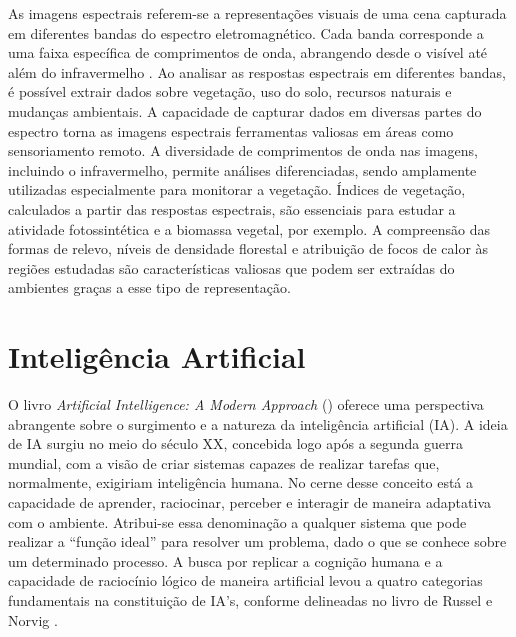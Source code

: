 As imagens espectrais referem-se a representações visuais de uma cena capturada em diferentes bandas do espectro eletromagnético. Cada banda corresponde a uma faixa específica de comprimentos de onda, abrangendo desde o visível até além do infravermelho \cite{novo01:ponzoni}. Ao analisar as respostas espectrais em diferentes bandas, é possível extrair dados sobre vegetação, uso do solo, recursos naturais e mudanças ambientais. A capacidade de capturar dados em diversas partes do espectro torna as imagens espectrais ferramentas valiosas em áreas como sensoriamento remoto. A diversidade de comprimentos de onda nas imagens, incluindo o infravermelho, permite análises diferenciadas, sendo amplamente utilizadas especialmente para monitorar a vegetação. Índices de vegetação, calculados a partir das respostas espectrais, são essenciais para estudar a atividade fotossintética e a biomassa vegetal, por exemplo. A compreensão das formas de relevo, níveis de densidade florestal e atribuição de focos de calor às regiões estudadas são características valiosas que podem ser extraídas do ambientes graças a esse tipo de representação.


\section{Inteligência Artificial}

O livro \textit{Artificial Intelligence: A Modern Approach} (\citeyear{russel20}) oferece uma perspectiva abrangente sobre o surgimento e a natureza da inteligência artificial (IA). A ideia de IA surgiu no meio do século XX, concebida logo após a segunda guerra mundial, com a visão de criar sistemas capazes de realizar tarefas que, normalmente, exigiriam inteligência humana. No cerne desse conceito está a capacidade de aprender, raciocinar, perceber e interagir de maneira adaptativa com o ambiente. Atribui-se essa denominação a qualquer sistema que pode realizar a ``função ideal'' para resolver um problema, dado o que se conhece sobre um determinado processo. A busca por replicar a cognição humana e a capacidade de raciocínio lógico de maneira artificial levou a quatro categorias fundamentais na constituição de IA's, conforme delineadas no livro de Russel e Norvig \cite{russel20}.

